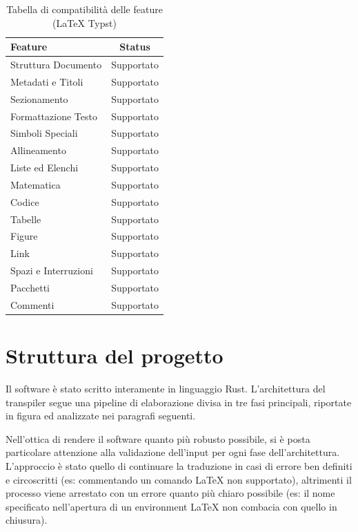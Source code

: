 \documentclass{article}
\begin{document}
    \begin{table}[ht]

        \caption{Tabella di compatibilità delle feature (LaTeX \textrightarrow Typst)}

        \begin{tabular}{|l|c|}
            \hline
            \textbf{Feature} & \textbf{Status} \\ \hline
            Struttura Documento & Supportato \\ \hline
            Metadati e Titoli & Supportato \\ \hline
            Sezionamento & Supportato \\ \hline
            Formattazione Testo & Supportato \\ \hline
            Simboli Speciali & Supportato \\ \hline
            Allineamento & Supportato \\ \hline
            Liste ed Elenchi & Supportato \\ \hline
            Matematica & Supportato \\ \hline
            Codice & Supportato \\ \hline
            Tabelle & Supportato \\ \hline
            Figure & Supportato \\ \hline
            Link & Supportato \\ \hline
            Spazi e Interruzioni & Supportato \\ \hline
            Pacchetti & Supportato \\ \hline
            Commenti & Supportato \\ \hline
        \end{tabular}
    \end{table}


    \section{Struttura del progetto}

    Il software è stato scritto interamente in linguaggio Rust.
    L'architettura del transpiler segue una pipeline di elaborazione divisa in tre fasi principali, riportate in figura ed analizzate nei paragrafi seguenti.

    Nell'ottica di rendere il software quanto più robusto possibile, si è posta particolare attenzione alla validazione dell'input per ogni fase dell'architettura.
    L'approccio è stato quello di continuare la traduzione in casi di errore ben definiti e circoscritti (es: commentando un comando LaTeX non supportato), altrimenti il processo viene arrestato con un errore quanto più chiaro possibile (es: il nome specificato nell'apertura di un environment LaTeX non combacia con quello in chiusura).
\end{document}
